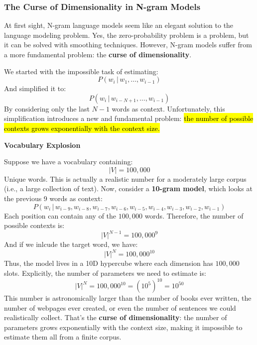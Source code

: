 \subsubsection{The Curse of Dimensionality in N-gram Models}\label{sec:the-curse-of-dimensionality-in-n-gram-models}

At first sight, N-gram language models seem like an elegant solution to the language modeling problem. Yes, the zero-probability problem is a problem, but it can be solved with smoothing techniques. However, N-gram models suffer from a more fundamental problem: the \textbf{curse of dimensionality}.

\highspace
We started with the impossible task of estimating:
\begin{equation*}
    P\left(w_i \, | \, w_{1}, \dots, w_{i-1}\right)
\end{equation*}
And simplified it to:
\begin{equation*}
    P\left(w_i \, | \, w_{i-N+1}, \dots, w_{i-1}\right)
\end{equation*}
By considering only the last $N-1$ words as context. Unfortunately, this simplification introduces a new and fundamental problem: \hl{the number of possible contexts grows exponentially with the context size.}

\highspace
\begin{flushleft}
    \textcolor{Red2}{ \textbf{Vocabulary Explosion}}
\end{flushleft}
Suppose we have a vocabulary containing:
\begin{equation*}
    \left|V\right| = 100,000
\end{equation*}
Unique words. This is actually a realistic number for a moderately large corpus (i.e., a large collection of text). Now, consider a \textbf{10-gram model}, which looks at the previous 9 words as context:
\begin{equation*}
    P\left(w_i \, | \, w_{i-9}, w_{i-8}, w_{i-7}, w_{i-6}, w_{i-5}, w_{i-4}, w_{i-3}, w_{i-2}, w_{i-1}\right)
\end{equation*}
Each position can contain any of the $100,000$ words. Therefore, the number of possible contexts is:
\begin{equation*}
    \left|V\right|^{N-1} = 100,000^9
\end{equation*}
And if we inlcude the target word, we have:
\begin{equation*}
    \left|V\right|^N = 100,000^{10}
\end{equation*}
Thus, the model lives in a 10D hypercube where each dimension has $100,000$ slots. Explicitly, the number of parameters we need to estimate is:
\begin{equation*}
    \left|V\right|^N = 100,000^{10} = \left(10^{5}\right)^{10} = 10^{50}
\end{equation*}
This number is astronomically larger than the number of books ever written, the number of webpages ever created, or even the number of sentences we could realistically collect. That's the \textbf{curse of dimensionality}: the number of parameters grows exponentially with the context size, making it impossible to estimate them all from a finite corpus.

